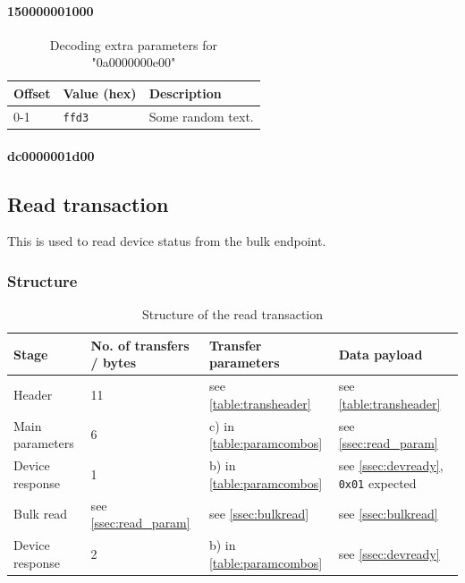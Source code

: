 \documentclass{article}
\begin{document}
\paragraph{150000001000}

\begin{table}[H]
  \caption{Decoding extra parameters for "0a0000000e00"}
  \centering
  \begin{tabular}{p{1cm} | p{1cm} | p{7cm}}
    Offset & Value (hex) & Description \\ \hline
    0-1 & {\tt ffd3} & Some random text. \\
  \end{tabular}
\end{table}

\paragraph{dc0000001d00}

\subsection{Read transaction}

This is used to read device status from the bulk endpoint.

\subsubsection{Structure}

\begin{table}[H]
  \caption{Structure of the read transaction}
  \centering
  \begin{tabular}{p{3cm} | p{1.5cm} | p{3cm} | p{3cm}}
    Stage & No. of transfers / bytes & Transfer parameters & Data payload \\ \hline
    
    Header & 11 & see \autoref{table:transheader} & see \autoref{table:transheader} \\
    Main parameters & 6 & c) in \autoref{table:paramcombos} & see \ref{ssec:read_param} \\
    Device response & 1 & b) in \autoref{table:paramcombos} & see \ref{ssec:devready}, {\tt 0x01} expected \\
    Bulk read & see \ref{ssec:read_param} & see \ref{ssec:bulkread} & see \ref{ssec:bulkread} \\
    Device response & 2 & b) in \autoref{table:paramcombos} & see \ref{ssec:devready} \\
  \end{tabular}
\end{table}
\end{document}
